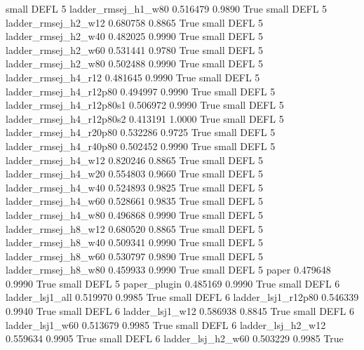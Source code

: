      small     DEFL                 5      ladder_rmsej_h1_w80   0.516479      0.9890    True
     small     DEFL                 5      ladder_rmsej_h2_w12   0.680758      0.8865    True
     small     DEFL                 5      ladder_rmsej_h2_w40   0.482025      0.9990    True
     small     DEFL                 5      ladder_rmsej_h2_w60   0.531441      0.9780    True
     small     DEFL                 5      ladder_rmsej_h2_w80   0.502488      0.9990    True
     small     DEFL                 5      ladder_rmsej_h4_r12   0.481645      0.9990    True
     small     DEFL                 5   ladder_rmsej_h4_r12p80   0.494997      0.9990    True
     small     DEFL                 5 ladder_rmsej_h4_r12p80s1   0.506972      0.9990    True
     small     DEFL                 5 ladder_rmsej_h4_r12p80s2   0.413191      1.0000    True
     small     DEFL                 5   ladder_rmsej_h4_r20p80   0.532286      0.9725    True
     small     DEFL                 5   ladder_rmsej_h4_r40p80   0.502452      0.9990    True
     small     DEFL                 5      ladder_rmsej_h4_w12   0.820246      0.8865    True
     small     DEFL                 5      ladder_rmsej_h4_w20   0.554803      0.9660    True
     small     DEFL                 5      ladder_rmsej_h4_w40   0.524893      0.9825    True
     small     DEFL                 5      ladder_rmsej_h4_w60   0.528661      0.9835    True
     small     DEFL                 5      ladder_rmsej_h4_w80   0.496868      0.9990    True
     small     DEFL                 5      ladder_rmsej_h8_w12   0.680520      0.8865    True
     small     DEFL                 5      ladder_rmsej_h8_w40   0.509341      0.9990    True
     small     DEFL                 5      ladder_rmsej_h8_w60   0.530797      0.9890    True
     small     DEFL                 5      ladder_rmsej_h8_w80   0.459933      0.9990    True
     small     DEFL                 5                    paper   0.479648      0.9990    True
     small     DEFL                 5             paper_plugin   0.485169      0.9990    True
     small     DEFL                 6          ladder_lsj1_all   0.519970      0.9985    True
     small     DEFL                 6       ladder_lsj1_r12p80   0.546339      0.9940    True
     small     DEFL                 6          ladder_lsj1_w12   0.586938      0.8845    True
     small     DEFL                 6          ladder_lsj1_w60   0.513679      0.9985    True
     small     DEFL                 6        ladder_lsj_h2_w12   0.559634      0.9905    True
     small     DEFL                 6        ladder_lsj_h2_w60   0.503229      0.9985    True

